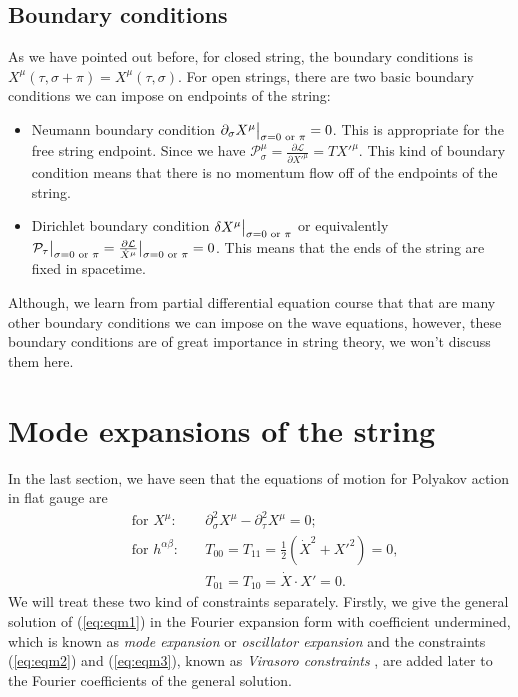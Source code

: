 \documentclass[graybox,envcountchap,sectrefs]{svmono}
\begin{document}
\subsection{Boundary conditions}
As we have pointed out before, for closed string, the boundary conditions is $X^{\mu}(\tau,\sigma+\pi)=X^{\mu}(\tau,\sigma)$. For open strings, there are two basic boundary conditions we can impose on endpoints of the string: 
\begin{itemize}
\item Neumann boundary condition $\partial_{\sigma}X^{\mu}\big{|}_{\sigma=0 \,\,\text{or}\,\, \pi}=0$. This is appropriate for the free string endpoint. Since we have $\mathcal{P}_{\sigma}^{\mu}=\frac{\partial \mathcal{L}}{\partial {X'}^{\mu}}=T{X'}^{\mu}$. This kind of boundary condition means that there is no momentum flow off of the endpoints of the string. 
\item Dirichlet boundary condition $\delta X^{\mu}\big{|}_{\sigma=0 \,\,\text{or}\,\, \pi}$ or equivalently $\mathcal{P}_{\tau}\big{|}_{\sigma=0 \,\,\text{or}\,\, \pi}=\frac{\partial \mathcal{L}}{\dot{X}^{\mu}}\big{|}_{\sigma=0 \,\,\text{or}\,\, \pi}=0$. This means that the ends of the string are fixed in spacetime.
\end{itemize}

Although, we learn from partial differential equation course that that are many other boundary conditions we can impose on the wave equations, however, these boundary conditions are of great importance in string theory, we won't discuss them here.


\section{Mode expansions of the string}
In the last section, we have seen that the equations of motion for Polyakov action in flat gauge are
\begin{align}
&\text{for}\,\, X^{\mu}:\quad & \partial_{\sigma}^2X^{\mu}-\partial^2_{\tau}X^{\mu}=0;\label{eq:eqm1}\\
&\text{for}\,\, h^{\alpha\beta}: \quad &T_{00}=T_{11}=\frac{1}{2}(\dot{X}^2+X'^2)=0, \label{eq:eqm2}\\
& &T_{01}=T_{10}=\dot{X}\cdot X'=0.\label{eq:eqm3}
\end{align}
We will treat these two kind of constraints separately. Firstly, we give the general solution of (\ref{eq:eqm1}) in the Fourier expansion form with coefficient undermined, 
which is known as \emph{mode expansion}  or \emph{oscillator expansion}  and the constraints  (\ref{eq:eqm2}) and (\ref{eq:eqm3}), known as \emph{Virasoro constraints} , are added later to the Fourier coefficients of the general solution.
\end{document}
